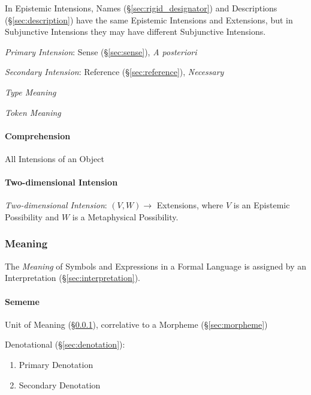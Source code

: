 In Epistemic Intensions, Names (\S\ref{sec:rigid_designator}) and
Descriptions (\S\ref{sec:description}) have the same Epistemic
Intensions and Extensions, but in Subjunctive Intensions they may have
different Subjunctive Intensions.

\emph{Primary Intension}: Sense (\S\ref{sec:sense}), \emph{A
  posteriori}

\emph{Secondary Intension}: Reference (\S\ref{sec:reference}),
\emph{Necessary}

\emph{Type Meaning}

\emph{Token Meaning}



\paragraph{Comprehension}\label{sec:comprehension}\hfill

All Intensions of an Object



\paragraph{Two-dimensional Intension}\label{sec:twodimensional_intension}\hfill

\emph{Two-dimensional Intension}: $(V,W) \rightarrow$ Extensions,
where $V$ is an Epistemic Possibility and $W$ is a Metaphysical
Possibility.



\subsubsection{Meaning}\label{sec:meaning}

The \emph{Meaning} of Symbols and Expressions in a Formal Language is
assigned by an Interpretation (\S\ref{sec:interpretation}).



\paragraph{Sememe}\label{sec:sememe}\hfill

Unit of Meaning (\S\ref{sec:meaning}), correlative to a Morpheme
(\S\ref{sec:morpheme})

Denotational (\S\ref{sec:denotation}):

\begin{enumerate}
  \item Primary Denotation
  \item Secondary Denotation
\end{enumerate}

